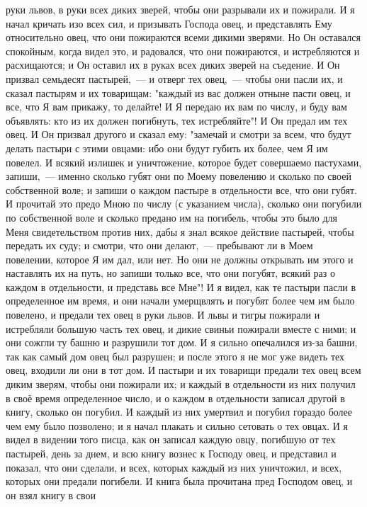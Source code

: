 руки львов, в руки всех диких зверей, чтобы они разрывали их и пожирали.
И я начал кричать изо всех сил, и призывать Господа овец, и
представлять Ему относительно овец, что они пожираются всеми дикими зверями.
Но Он оставался спокойным, когда видел это, и радовался, что они
пожираются, и истребляются и расхищаются; и Он оставил их в руках всех диких
зверей на съедение.
И Он призвал семьдесят пастырей,~--- и отверг тех овец,~--- чтобы они
пасли их, и сказал пастырям и их товарищам: "каждый из вас должен отныне пасти
овец, и все, что Я вам прикажу, то делайте!
И Я передаю их вам по числу, и буду вам объявлять: кто из их должен
погибнуть, тех истребляйте"!
И Он предал им тех овец.
И Он призвал другого и сказал ему: "замечай и смотри за всем, что
будут делать пастыри с этими овцами: ибо они будут губить их более, чем Я им
повелел.
И всякий излишек и уничтожение, которое будет совершаемо пастухами,
запиши,~--- именно сколько губят они по Моему повелению и сколько по своей
собственной воле; и запиши о каждом пастыре в отдельности все, что они губят.
И прочитай это предо Мною по числу (с указанием числа), сколько они
погубили по собственной воле и сколько предано им на погибель, чтобы это было
для Меня свидетельством против них, дабы я знал всякое действие пастырей, чтобы
передать их суду; и смотри, что они делают,~--- пребывают ли в Моем повелении,
которое Я им дал, или нет.
Но они не должны открывать им этого и наставлять их на путь, но запиши
только все, что они погубят, всякий раз о каждом в отдельности, и представь все
Мне"!
И я видел, как те пастыри пасли в определенное им время, и они начали
умерщвлять и погубят более чем им было повелено, и предали тех овец в руки
львов.
И львы и тигры пожирали и истребляли большую часть тех овец, и дикие
свиньи пожирали вместе с ними; и они сожгли ту башню и разрушили тот дом.
И я сильно опечалился из-за башни, так как самый дом овец был
разрушен; и после этого я не мог уже видеть тех овец, входили ли они в тот дом.
И пастыри и их товарищи предали тех овец всем диким зверям, чтобы они
пожирали их; и каждый в отдельности из них получил в своё время определенное
число, и о каждом в отдельности записал другой в книгу, сколько он погубил.
И каждый из них умертвил и погубил гораздо более чем ему было
позволено; и я начал плакать и сильно сетовать о тех овцах.
И я видел в видении того писца, как он записал каждую овцу, погибшую
от тех пастырей, день за днем, и всю книгу вознес к Господу овец, и представил
и показал, что они сделали, и всех, которых каждый из них уничтожил, и всех,
которых они предали погибели.
И книга была прочитана пред Господом овец, и он взял книгу в свои
